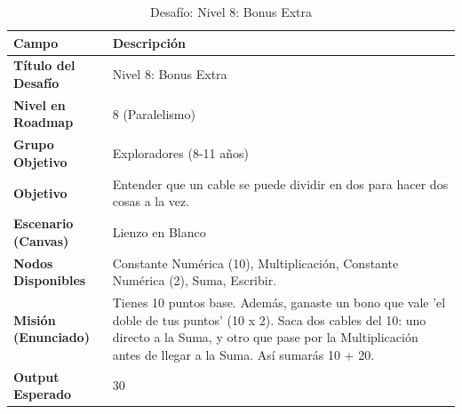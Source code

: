 \begin{table}[H]
    \centering
    \caption{Desafío: Nivel 8: Bonus Extra}
    \label{tab:desafio-exp-8}
    \begingroup
    \renewcommand{\arraystretch}{\TableRowStretch}
    \begin{tabularx}{\textwidth}{ l X }
        \hline
        \textbf{Campo}              & \textbf{Descripción}                                                                                                                                                                                                            \\
        \hline
        \textbf{Título del Desafío} & Nivel 8: Bonus Extra                                                                                                                                                                                                            \\
        \textbf{Nivel en Roadmap}   & 8 (Paralelismo)                                                                                                                                                                                                                 \\
        \textbf{Grupo Objetivo}     & Exploradores (8-11 años)                                                                                                                                                                                                        \\
        \textbf{Objetivo}           & Entender que un cable se puede dividir en dos para hacer dos cosas a la vez.                                                                                                                                                    \\
        \textbf{Escenario (Canvas)} & Lienzo en Blanco                                                                                                                                                                                                                \\
        \textbf{Nodos Disponibles}  & Constante Numérica (10), Multiplicación, Constante Numérica (2), Suma, Escribir.                                                                                                                                                \\
        \textbf{Misión (Enunciado)} & Tienes 10 puntos base. Además, ganaste un bono que vale 'el doble de tus puntos' (10 x 2). Saca dos cables del 10: uno directo a la Suma, y otro que pase por la Multiplicación antes de llegar a la Suma. Así sumarás 10 + 20. \\
        \textbf{Output Esperado}    & 30                                                                                                                                                                                                                              \\
        \hline
    \end{tabularx}
    \endgroup
\end{table}


